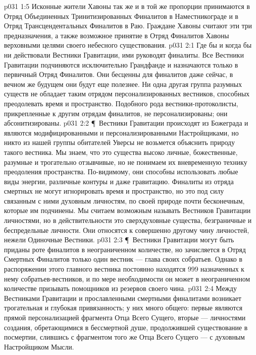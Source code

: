 \vs p031 1:5 Исконные жители Хавоны так же и в той же пропорции принимаются в Отряд Объединенных Тринитизированных Финалитов в Наместникограде и в Отряд Трансцендентальных Финалитов в Раю. Граждане Хавоны считают эти три предназначения, а также возможное принятие в Отряд Финалитов Хавоны верховными целями своего небесного существования.
\vs p031 2:1 Где бы и когда бы ни действовали Вестники Гравитации, ими руководят финалиты. Все Вестники Гравитации подчиняются исключительно Грандфанде и назначаются только в первичный Отряд Финалитов. Они бесценны для финалитов даже сейчас, в вечном же будущем они будут еще полезнее. Ни одна другая группа разумных существ не обладает таким отрядом персонализированных вестников, способных преодолевать время и пространство. Подобного рода вестники\hyp{}протоколисты, прикрепленные к другим отрядам финалитов, не персонализированы; они абсонитизированы.
\vs p031 2:2 \P\ Вестники Гравитации происходят из Божеграда и являются модифицированными и персонализированными Настройщиками, но никто из нашей группы обитателей Уверсы не возьмется объяснить природу такого вестника. Мы знаем, что это существа высоко личные, божественные, разумные и трогательно отзывчивые, но не понимаем их вневременную технику преодоления пространства. По\hyp{}видимому, они способны использовать любые виды энергии, различные контуры и даже гравитацию. Финалиты из отряда смертных не могут игнорировать время и пространство, но это под силу связанным с ними духовным личностям, по своей природе почти бесконечным, которые им подчинены. Мы считаем возможным называть Вестников Гравитации личностями, но в действительности это сверхдуховные существа, безграничные и беспредельные личности. Они относятся к совершенно другому чину личностей, нежели Одиночные Вестники.
\vs p031 2:3 \P\ Вестники Гравитации могут быть приданы роте финалитов в неограниченном количестве, но зачисляется в Отряд Смертных Финалитов только один вестник --- глава своих собратьев. Однако в распоряжении этого главного вестника постоянно находятся 999 назначенных к нему собратьев\hyp{}вестников, и по мере необходимости он может в неограниченном количестве призывать помощников из резервов своего чина.
\vs p031 2:4 Между Вестниками Гравитации и прославленными смертными финалитами возникает трогательная и глубокая привязанность; у них много общего: первые являются прямой персонализацией фрагмента Отца Всего Сущего, вторые --- личностями создания, обретающимися в бессмертной душе, продолжившей существование в посмертии, слившись с фрагментом того же Отца Всего Сущего --- с духовным Настройщиком Мысли.
